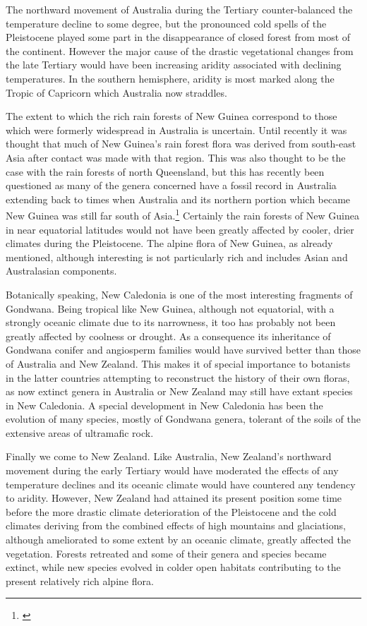 The northward movement of Australia during the Tertiary counter-balanced the temperature decline to some degree, but the pronounced cold spells of the Pleistocene played some part in the disappearance of closed forest from most of the continent.
However the major cause of the drastic vegetational changes from the late Tertiary would have been increasing aridity associated with declining temperatures.
In the southern hemisphere, aridity is most marked along the Tropic of Capricorn which Australia now straddles.

The extent to which the rich rain forests of New Guinea correspond to those which were formerly widespread in Australia is uncertain.
Until recently it was thought that much of New Guinea's rain forest flora was derived from south-east Asia after contact was made with that region.
This was also thought to be the case with the rain forests of north Queensland, but this has recently been questioned as many of the genera concerned have a fossil record in Australia extending back to times when Australia and its northern portion which became New Guinea was still far south of Asia.\footnote{\cite{webb1986recent}}
Certainly the rain forests of New Guinea in near equatorial latitudes would not have been greatly affected by cooler, drier climates during the Pleistocene.
The alpine flora of New Guinea, as already mentioned, although interesting is not particularly rich and includes Asian and Australasian components.

Botanically speaking, New Caledonia is one of the most interesting fragments of Gondwana.
Being tropical like New Guinea, although not equatorial, with a strongly oceanic climate due to its narrowness, it too has probably not been greatly affected by coolness or drought.
As a consequence its inheritance of Gondwana conifer and angiosperm families would have survived better than those of Australia and New Zealand.
This makes it of special importance to botanists in the latter countries attempting to reconstruct the history of their own floras, as now extinct genera in Australia or New Zealand may still have extant species in New Caledonia.
A special development in New Caledonia has been the evolution of many species, mostly of Gondwana genera, tolerant of the soils of the extensive areas of ultramafic rock.

Finally we come to New Zealand.
Like Australia, New Zealand's northward movement during the early Tertiary would have moderated the effects of any temperature declines and its oceanic climate would have countered any tendency to aridity.
However, New Zealand had attained its present position some time before the more drastic climate deterioration of the Pleistocene and the cold climates deriving from the combined effects of high mountains and glaciations, although ameliorated to some extent by an oceanic climate, greatly affected the vegetation.
Forests retreated and some of their genera and species became extinct, while new species evolved in colder open habitats contributing to the present relatively rich alpine flora.

